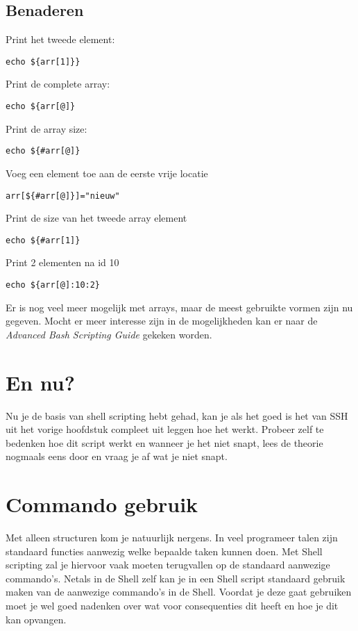 \subsection{Benaderen}
Print het tweede element:
\begin{lstlisting}
echo ${arr[1]}} 
\end{lstlisting}%

Print de complete array:
\begin{lstlisting}
echo ${arr[@]}
\end{lstlisting}%

Print de array size:
\begin{lstlisting}
echo ${#arr[@]}
\end{lstlisting}%

Voeg een element toe aan de eerste vrije locatie
\begin{lstlisting}
arr[${#arr[@]}]="nieuw"
\end{lstlisting}%

Print de size van het tweede array element 
\begin{lstlisting}
echo ${#arr[1]}
\end{lstlisting}%

Print 2 elementen na id 10 
\begin{lstlisting}
echo ${arr[@]:10:2}
\end{lstlisting}%

Er is nog veel meer mogelijk met arrays, maar de meest gebruikte vormen zijn nu gegeven. Mocht er meer interesse zijn in de mogelijkheden kan er naar de \emph{Advanced Bash Scripting Guide}\cite{bib.tldp.abs} gekeken worden. 

\section{En nu?}
Nu je de basis van shell scripting hebt gehad, kan je als het goed is het van SSH uit het vorige hoofdstuk compleet uit leggen hoe het werkt. Probeer zelf te bedenken hoe dit script werkt en wanneer je het niet snapt, lees de theorie nogmaals eens door en vraag je af wat je niet snapt. 

\section{Commando gebruik}
Met alleen structuren kom je natuurlijk nergens. In veel programeer talen zijn standaard functies aanwezig welke bepaalde taken kunnen doen. Met Shell scripting zal je hiervoor vaak moeten terugvallen op de standaard aanwezige commando's. Netals in de Shell zelf kan je in een Shell script standaard gebruik maken van de aanwezige commando's in de Shell. Voordat je deze gaat gebruiken moet je wel goed nadenken over wat voor consequenties dit heeft en hoe je dit kan opvangen. 

